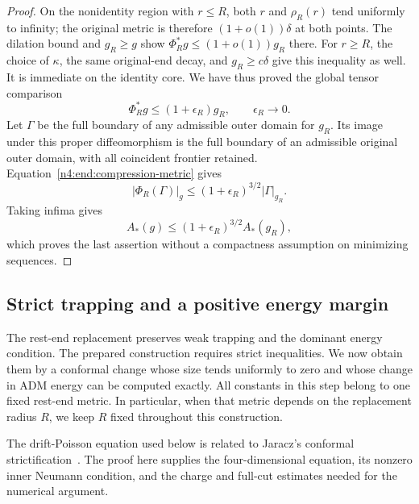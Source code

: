 \begin{proof}
On the nonidentity region with \(r\le R\), both \(r\) and
\(\rho_R(r)\) tend uniformly to infinity; the original metric is
therefore \((1+o(1))\delta\) at both points. The dilation bound and
\(g_R\ge g\) show
\(\Phi_R^*g\le(1+o(1))g_R\) there. For \(r\ge R\), the choice
of \(\kappa\), the same original-end decay, and \(g_R\ge c\delta\)
give this inequality as well. It is immediate on the identity core.
We have thus proved the global tensor comparison
\begin{equation}\label{n4:end:compression-metric}
 \Phi_R^*g\le(1+\epsilon_R)g_R,\qquad\epsilon_R\longrightarrow0.
\end{equation}
Let \(\Gamma\) be the full boundary of any admissible outer domain
for \(g_R\). Its image under this proper diffeomorphism is the full
boundary of an admissible original outer domain, with all coincident
frontier retained. Equation~\eqref{n4:end:compression-metric} gives
\[
 |\Phi_R(\Gamma)|_g
 \le(1+\epsilon_R)^{3/2}|\Gamma|_{g_R}.
\]
Taking infima gives
\[
 A_*(g)\le(1+\epsilon_R)^{3/2}A_*(g_R),
\]
which proves the last assertion without a compactness assumption on
minimizing sequences.
\end{proof}

\subsection{Strict trapping and a positive energy margin}
\label{n4:sec:strictification}

The rest-end replacement preserves weak trapping and the dominant energy
condition.  The prepared construction requires strict inequalities.  We
now obtain them by a conformal change whose size tends uniformly to zero
and whose change in ADM energy can be computed exactly.  All constants
in this step belong to one fixed rest-end metric.  In particular, when
that metric depends on the replacement radius \(R\), we keep \(R\)
fixed throughout this construction.

The drift-Poisson equation used below is related to Jaracz's conformal
strictification~\cite{Jaracz2025StrictDEC}.  The proof here supplies the
four-dimensional equation, its nonzero inner Neumann condition, and the
charge and full-cut estimates needed for the numerical argument.

